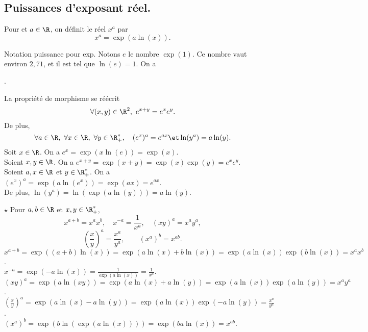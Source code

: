 \documentclass[11pt]{article}
\begin{document}
\subsection{Puissances d'exposant réel.}

\begin{defi}{}{}
    Pour  et $a\in\R$, on définit le réel $x^a$ par
    \begin{equation*}
        x^a=\exp(a\ln(x)).
    \end{equation*}
\end{defi}

\pagebreak

\begin{prop}{Notation puissance pour exp.}{}
    Notons $e$ le nombre $\exp(1)$. Ce nombre vaut environ $2,71$, et il est tel que $\ln(e)=1$. On a
    \begin{center}
        .
    \end{center}
    La propriété de morphisme se réécrit
    \begin{equation*}
        \forall (x,y) \in \R^2,~e^{x+y}=e^xe^y.
    \end{equation*}
    De plus,
    \begin{equation*}
        \forall a \in \R,~\forall x \in \R,~\forall y \in \R_+^*,\quad(e^x)^a=e^{ax}\et\ln(y^a)=a\ln(y).
    \end{equation*}
    \tcblower
    Soit $x\in\R$. On a $e^x=\exp(x\ln(e))=\exp(x)$.\\
    Soient $x,y\in\R$. On a $e^{x+y}=\exp(x+y)=\exp(x)\exp(y)=e^xe^y$.\\
    Soient $a,x\in\R$ et $y\in\R^*_+$. On a $(e^x)^a=\exp(a\ln(e^x))=\exp(ax)=e^{ax}$.\\
    De plus, $\ln(y^a)=\ln(\exp(a\ln(y)))=a\ln(y)$.
\end{prop}

\begin{prop}{$\star$}{}
    Pour $a,b\in\R$ et $x,y\in\R_+^*$,
    \begin{equation*}
        x^{a+b}=x^ax^b,\quad x^{-a}=\frac{1}{x^a},\quad(xy)^a=x^ay^a,
    \end{equation*}
    \begin{equation*}
        \left( \frac{x}{y} \right)^a=\frac{x^a}{y^a},\qquad(x^a)^b=x^{ab}.
    \end{equation*}
    \tcblower
     $x^{a+b}=\exp((a+b)\ln(x))=\exp(a\ln(x)+b\ln(x))=\exp(a\ln(x))\exp(b\ln(x))=x^ax^b$.\\
     $x^{-a}=\exp(-a\ln(x))=\frac{1}{\exp(a\ln(x))}=\frac{1}{x^a}$.\\
     $(xy)^a=\exp(a\ln(xy))=\exp(a\ln(x)+a\ln(y))=\exp(a\ln(x))\exp(a\ln(y))=x^ay^a$.\\
     $\left( \frac{x}{y} \right)^a=\exp(a\ln(x)-a\ln(y))=\exp(a\ln(x))\exp(-a\ln(y))=\frac{x^a}{y^a}$.\\
     $(x^a)^b=\exp(b\ln(\exp(a\ln(x))))=\exp(ba\ln(x))=x^{ab}$.
\end{prop}
\end{document}
